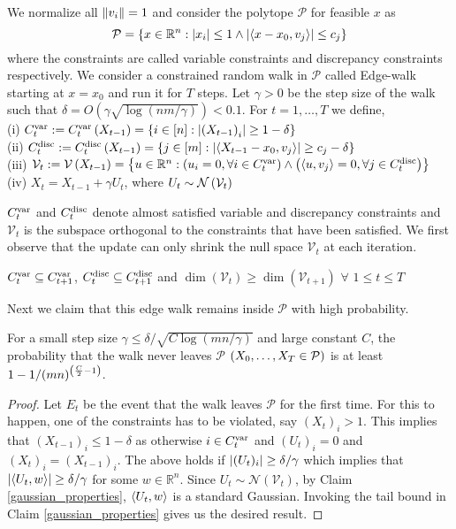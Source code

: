 We normalize all $\left\lVert v_i \right\rVert=1$ and consider the polytope $\mathcal{P}$ for feasible $x$ as
\[ \mathcal{P} = \left\{x\in \mathbb{R}^n : \left\lvert x_i \right\rvert \leq 1 \wedge \left\lvert \left\langle x-x_0,v_j\right\rangle \right\rvert \leq c_j \right\}\]
where the constraints are called variable constraints and discrepancy constraints respectively.
We consider a constrained random walk in $\mathcal{P}$ called Edge-walk starting at $x=x_0$ and run it for $T$ steps. Let $\gamma >0$ be the step size of the walk such that $\delta = O(\gamma \sqrt{\log(nm/\gamma)}) < 0.1$. For $t= 1,\hdots,T$ we define,\\
(i) $C^{\mathrm{var}}_t := C^{\mathrm{var}}_t\left(X_{t-1} \right ) = \left\{ i \in [n] : \left\lvert \left(X_{t-1} \right )_i \right\rvert \geq 1- \delta\right\}$ \\
(ii) $C^{\mathrm{disc}}_t := C^{\mathrm{disc}}_t\left(X_{t-1} \right ) = \left\{j \in [m] : \left\lvert \left\langle X_{t-1}-x_0,v_j\right\rangle \right\rvert \geq c_j - \delta\right\}$ \\
(iii) $\mathcal{V}_t := \mathcal{V}\left(X_{t-1} \right ) = \left\{u \in \mathbb{R}^n : \left(u_i = 0, \forall i \in C^{\mathrm{var}}_t \right ) \wedge \left(\left\langle u,v_j\right\rangle=0, \forall j \in C^{\mathrm{disc}}_t \right ) \right\}$  \\
(iv) $X_t = X_{t-1} + \gamma U_t$, where $U_t \sim \mathcal{N}\left(\mathcal{V}_t \right )$

$C^{\mathrm{var}}_t$ and $C^{\mathrm{disc}}_t$ denote almost satisfied variable and discrepancy constraints and $\mathcal{V}_t$ is the subspace orthogonal to the constraints that have been satisfied.
We first observe that the update can only shrink the null space $\mathcal{V}_t$ at each iteration.
\begin{Claim}
$C^{\mathrm{var}}_t \subseteq C^{\mathrm{var}}_{t+1}$, $C^{\mathrm{disc}}_t \subseteq C^{\mathrm{disc}}_{t+1}$ and $\dim(\mathcal{V}_t) \geq \dim(\mathcal{V}_{t+1})$ $\forall$ $1 \leq t \leq T$
\end{Claim}

Next we claim that this edge walk remains inside $\mathcal{P}$ with high probability.
\begin{Claim}
For a small step size $\gamma \leq \delta/\sqrt{C\log(mn/\gamma)}$ and large constant $C$, the probability that the walk never leaves $\mathcal{P}$ $\left(X_0,\hdots,X_T \in \mathcal{P} \right )$ is at least $1 - 1/(mn)^{\left(\frac{C}{2}-1 \right )}$.
\end{Claim}
\begin{proof}
Let $E_t$ be the event that the walk leaves $\mathcal{P}$ for the first time.
For this to happen, one of the constraints has to be violated, say $(X_t)_i>1$.
This implies that $(X_{t-1})_i \leq 1 - \delta$ as otherwise $i \in C^{\mathrm{var}}_t$ and $(U_t)_i=0$ and $(X_{t})_i=(X_{t-1})_i$.
The above holds if $\left\lvert (U_t)_i \right\rvert \geq \delta/\gamma$ which implies that $\left\lvert \left\langle U_t,w\right\rangle \right\rvert \geq \delta/\gamma$ for some $w \in \mathbb{R}^n$.
Since $U_t \sim \mathcal{N}(\mathcal{V}_t)$, by Claim \ref{gaussian_properties}, $\left\langle U_t,w\right\rangle$ is a standard Gaussian.
Invoking the tail bound in Claim \ref{gaussian_properties} gives us the desired result.
\end{proof}

